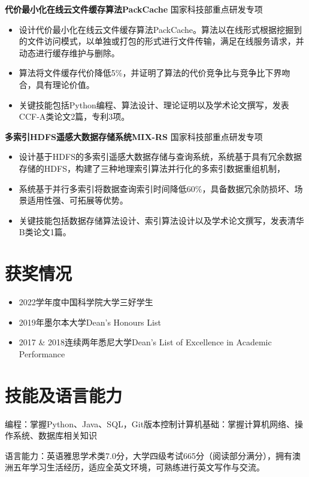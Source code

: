 \documentclass[letterpaper,11pt]{article}
\begin{document}
\vspace{1pt}

\textbf{代价最小化在线云文件缓存算法PackCache} \hfill 国家科技部重点研发专项

\begin{itemize}
  \setlength\itemsep{2pt}
  \item 设计代价最小化在线云文件缓存算法PackCache。算法以在线形式根据挖掘到的文件访问模式，以单独或打包的形式进行文件传输，满足在线服务请求，并动态进行缓存维护与删除。
  \item 算法将文件缓存代价降低5\%，并证明了算法的代价竞争比与竞争比下界吻合，具有理论价值。
  \item 关键技能包括Python编程、算法设计、理论证明以及学术论文撰写，发表CCF-A类论文2篇，专利3项。
\end{itemize}

\vspace{1pt}

\textbf{多索引HDFS遥感大数据存储系统MIX-RS} \hfill 国家科技部重点研发专项

\begin{itemize}
  \setlength\itemsep{2pt}
  \item 设计基于HDFS的多索引遥感大数据存储与查询系统，系统基于具有冗余数据存储的HDFS，构建了三种地理索引算法并行化的多索引数据重组机制，
  \item 系统基于并行多索引将数据查询索引时间降低60\%，具备数据冗余防损坏、场景适用性强、可拓展等优势。
  \item 关键技能包括数据存储算法设计、索引算法设计以及学术论文撰写，发表清华B类论文1篇。
\end{itemize}




\section{获奖情况}
\begin{itemize}
  \setlength\itemsep{2pt}
  \item 2022学年度中国科学院大学三好学生
  \item 2019年墨尔本大学Dean's Honours List
  \item 2017 \& 2018连续两年悉尼大学Dean's List of Excellence in Academic Performance
\end{itemize}




\section{技能及语言能力}

编程：掌握Python、Java、SQL，Git版本控制\hspace{1cm}计算机基础：掌握计算机网络、操作系统、数据库相关知识

语言能力：英语雅思学术类7.0分，大学四级考试665分（阅读部分满分），拥有澳洲五年学习生活经历，适应全英文环境，可熟练进行英文写作与交流。
\end{document}
